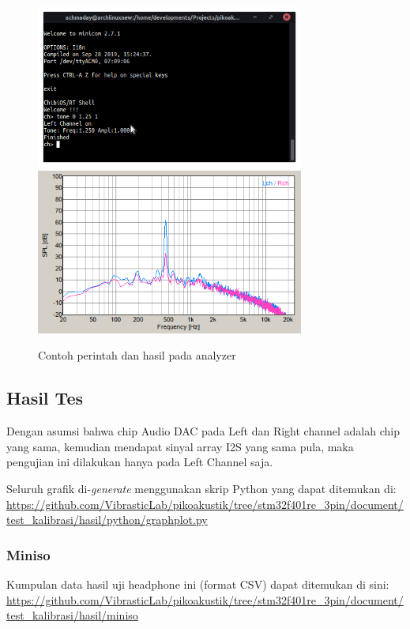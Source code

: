\documentclass[12pt,]{article}
\begin{document}
\begin{enumerate}
		\begin{figure}[!ht]
			\centering
			\includegraphics[width=250pt]{hasil/test/cmdtest}
			\includegraphics[width=250pt]{hasil/test/test}
			\caption{Contoh perintah dan hasil pada analyzer}
		\end{figure}
	\end{enumerate}

	\subsection{Hasil Tes}
	
	Dengan asumsi bahwa chip Audio DAC pada Left dan Right channel adalah chip yang sama,
	kemudian mendapat sinyal array I2S yang sama pula,
	maka pengujian ini dilakukan hanya pada Left Channel saja.
	
	Seluruh grafik di-\textit{generate} menggunakan skrip Python yang dapat ditemukan di:\\
	\url{https://github.com/VibrasticLab/pikoakustik/tree/stm32f401re_3pin/document/test_kalibrasi/hasil/python/graphplot.py}
	
  	\subsubsection{Miniso}
  	
  	Kumpulan data hasil uji headphone ini (format CSV) dapat ditemukan di sini:\\
  	\url{https://github.com/VibrasticLab/pikoakustik/tree/stm32f401re_3pin/document/test_kalibrasi/hasil/miniso}
  	
\end{document}
